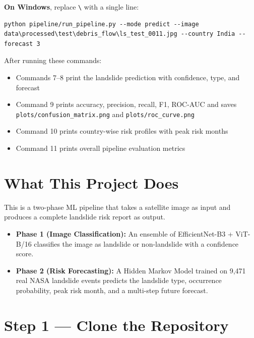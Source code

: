 \documentclass[11pt]{article}
\begin{document}
\noindent \textbf{On Windows}, replace \texttt{\textbackslash} with a single line:
\begin{verbatim}
python pipeline/run_pipeline.py --mode predict --image data\processed\test\debris_flow\ls_test_0011.jpg --country India --forecast 3
\end{verbatim}

\noindent After running these commands:
\begin{itemize}[noitemsep]
    \item Commands 7--8 print the landslide prediction with confidence, type, and forecast
    \item Command 9 prints accuracy, precision, recall, F1, ROC-AUC and saves \texttt{plots/confusion\_matrix.png} and \texttt{plots/roc\_curve.png}
    \item Command 10 prints country-wise risk profiles with peak risk months
    \item Command 11 prints overall pipeline evaluation metrics
\end{itemize}

\newpage

\section{What This Project Does}

This is a two-phase ML pipeline that takes a satellite image as input and produces a complete landslide risk report as output.

\begin{itemize}
    \item \textbf{Phase 1 (Image Classification):} An ensemble of EfficientNet-B3 + ViT-B/16 classifies the image as landslide or non-landslide with a confidence score.
    \item \textbf{Phase 2 (Risk Forecasting):} A Hidden Markov Model trained on 9,471 real NASA landslide events predicts the landslide type, occurrence probability, peak risk month, and a multi-step future forecast.
\end{itemize}

\section{Step 1 --- Clone the Repository}
\end{document}
